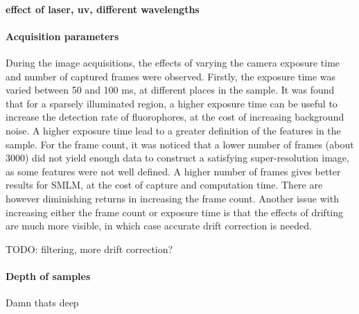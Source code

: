 \paragraph{effect of laser, uv, different wavelengths}

\paragraph{Acquisition parameters}
During the image acquisitions, the effects of varying the camera exposure time and number of captured frames were observed. Firstly, the exposure time was varied between 50 and 100 ms, at different places in the sample. It was found that for a sparsely illuminated region, a higher exposure time can be useful to increase the detection rate of fluorophores, at the cost of increasing background noise. A higher exposure time lead to a greater definition of the features in the sample. For the frame count, it was noticed that a lower number of frames (about 3000) did not yield enough data to construct a satisfying super-resolution image, as some features were not well defined. A higher number of frames gives better results for SMLM, at the cost of capture and computation time. There are however diminishing returns in increasing the frame count. Another issue with increasing either the frame count or exposure time is that the effects of drifting are much more visible, in which case accurate drift correction is needed.

TODO: filtering, more drift correction?

\paragraph{Depth of samples}
Damn thats deep